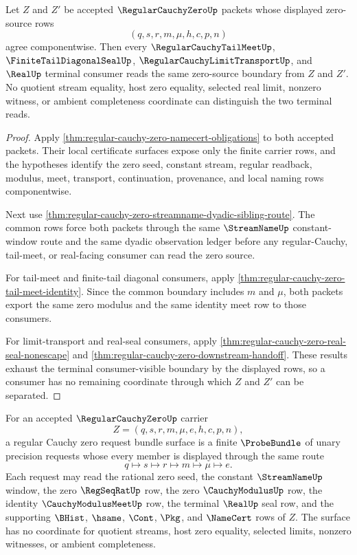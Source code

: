 \begin{theorem}
\label{thm:regular-cauchy-zero-terminal-consumer-uniqueness}
Let $Z$ and $Z'$ be accepted $\RegularCauchyZeroUp$ packets whose displayed zero-source rows
$$
(q,s,r,m,\mu,h,c,p,n)
$$
agree componentwise. Then every $\RegularCauchyTailMeetUp$, $\FiniteTailDiagonalSealUp$, $\RegularCauchyLimitTransportUp$, and $\RealUp$ terminal consumer reads the same zero-source boundary from $Z$ and $Z'$. No quotient stream equality, host zero equality, selected real limit, nonzero witness, or ambient completeness coordinate can distinguish the two terminal reads.
\end{theorem}
\begin{proof}
Apply \autoref{thm:regular-cauchy-zero-namecert-obligations} to both accepted packets. Their local certificate surfaces expose only the finite carrier rows, and the hypotheses identify the zero seed, constant stream, regular readback, modulus, meet, transport, continuation, provenance, and local naming rows componentwise.

Next use \autoref{thm:regular-cauchy-zero-streamname-dyadic-sibling-route}. The common rows force both packets through the same $\StreamNameUp$ constant-window route and the same dyadic observation ledger before any regular-Cauchy, tail-meet, or real-facing consumer can read the zero source.

For tail-meet and finite-tail diagonal consumers, apply \autoref{thm:regular-cauchy-zero-tail-meet-identity}. Since the common boundary includes $m$ and $\mu$, both packets export the same zero modulus and the same identity meet row to those consumers.

For limit-transport and real-seal consumers, apply \autoref{thm:regular-cauchy-zero-real-seal-nonescape} and \autoref{thm:regular-cauchy-zero-downstream-handoff}. These results exhaust the terminal consumer-visible boundary by the displayed rows, so a consumer has no remaining coordinate through which $Z$ and $Z'$ can be separated.
\end{proof}

\begin{definition}
\label{def:regular-cauchy-zero-request-bundle-surface}
For an accepted $\RegularCauchyZeroUp$ carrier
$$
Z=(q,s,r,m,\mu,e,h,c,p,n),
$$
a regular Cauchy zero request bundle surface is a finite $\ProbeBundle$ of unary precision requests whose every member is displayed through the same route
$$
q \mapsto s \mapsto r \mapsto m \mapsto \mu \mapsto e.
$$
Each request may read the rational zero seed, the constant $\StreamNameUp$ window, the zero $\RegSeqRatUp$ row, the zero $\CauchyModulusUp$ row, the identity $\CauchyModulusMeetUp$ row, the terminal $\RealUp$ seal row, and the supporting $\BHist$, $\hsame$, $\Cont$, $\Pkg$, and $\NameCert$ rows of $Z$. The surface has no coordinate for quotient streams, host zero equality, selected limits, nonzero witnesses, or ambient completeness.
\end{definition}

